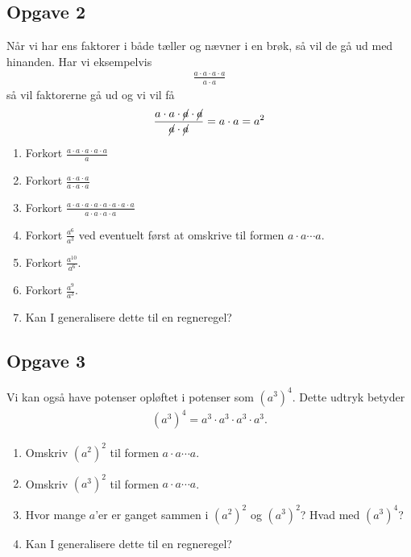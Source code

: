 \subsection*{Opgave 2}
Når vi har ens faktorer i både tæller og nævner i en brøk, så vil de gå ud med hinanden. Har vi eksempelvis
\begin{align*}
	\frac{a\cdot a\cdot a\cdot a}{a\cdot a}
\end{align*}
så vil faktorerne gå ud og vi vil få
\begin{align*}
	\frac{a \cdot a \cdot  \cancel{a} \cdot \cancel{a}}{\cancel{a}\cdot \cancel{a}} = a \cdot a = a^2
\end{align*}
\begin{enumerate}[label=\roman*)]
	\item Forkort $\frac{a\cdot a \cdot a \cdot a \cdot a}{a}$
	\item Forkort $\frac{a \cdot a \cdot a}{a \cdot a \cdot a}$
	\item Forkort $\frac{a \cdot a \cdot a \cdot a \cdot a \cdot a \cdot a \cdot a}{a \cdot a \cdot a \cdot a}$
	\item Forkort $\frac{a^6}{a^3}$ ved eventuelt først at omskrive til formen $a\cdot a\cdots a$.
	\item Forkort $\frac{a^{10}}{a^6}$.
	\item Forkort $\frac{a^9}{a^3}$.
	\item Kan I generalisere dette til en regneregel?
\end{enumerate}

\subsection*{Opgave 3}
Vi kan også have potenser opløftet i potenser som $(a^3)^4$. Dette udtryk betyder 
\begin{align*}
	(a^3)^4 = a^3\cdot a^3 \cdot a^3 \cdot a^3.
\end{align*}
\begin{enumerate}[label=\roman*)]
	\item Omskriv $(a^2)^2$ til formen $a\cdot a\cdots a$.
	\item Omskriv $(a^3)^2$ til formen $a\cdot a \cdots a$.
	\item Hvor mange $a$'er er ganget sammen i $(a^2)^2$ og $(a^3)^2$? Hvad med $(a^3)^4$?
	\item Kan I generalisere dette til en regneregel?
\end{enumerate}

